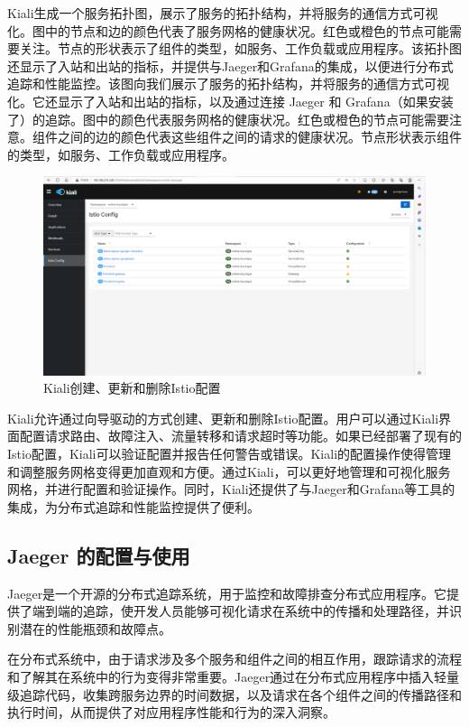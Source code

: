 Kiali生成一个服务拓扑图，展示了服务的拓扑结构，并将服务的通信方式可视化。图中的节点和边的颜色代表了服务网格的健康状况。红色或橙色的节点可能需要关注。节点的形状表示了组件的类型，如服务、工作负载或应用程序。该拓扑图还显示了入站和出站的指标，并提供与Jaeger和Grafana的集成，以便进行分布式追踪和性能监控。该图向我们展示了服务的拓扑结构，并将服务的通信方式可视化。它还显示了入站和出站的指标，以及通过连接 Jaeger 和 Grafana（如果安装了）的追踪。图中的颜色代表服务网格的健康状况。红色或橙色的节点可能需要注意。组件之间的边的颜色代表这些组件之间的请求的健康状况。节点形状表示组件的类型，如服务、工作负载或应用程序。
\begin{figure}[H]
	\centering
	\includegraphics[width=1.0\textwidth]{figures/chapter3/kiali-config.png}
	\caption{Kiali创建、更新和删除Istio配置}
	\label{fig:3-Kiali创建、更新和删除Istio配置}
\end{figure}
Kiali允许通过向导驱动的方式创建、更新和删除Istio配置。用户可以通过Kiali界面配置请求路由、故障注入、流量转移和请求超时等功能。如果已经部署了现有的Istio配置，Kiali可以验证配置并报告任何警告或错误。Kiali的配置操作使得管理和调整服务网格变得更加直观和方便。通过Kiali，可以更好地管理和可视化服务网格，并进行配置和验证操作。同时，Kiali还提供了与Jaeger和Grafana等工具的集成，为分布式追踪和性能监控提供了便利。

\subsection{Jaeger 的配置与使用}
Jaeger是一个开源的分布式追踪系统，用于监控和故障排查分布式应用程序。它提供了端到端的追踪，使开发人员能够可视化请求在系统中的传播和处理路径，并识别潜在的性能瓶颈和故障点。

在分布式系统中，由于请求涉及多个服务和组件之间的相互作用，跟踪请求的流程和了解其在系统中的行为变得非常重要。Jaeger通过在分布式应用程序中插入轻量级追踪代码，收集跨服务边界的时间数据，以及请求在各个组件之间的传播路径和执行时间，从而提供了对应用程序性能和行为的深入洞察。

